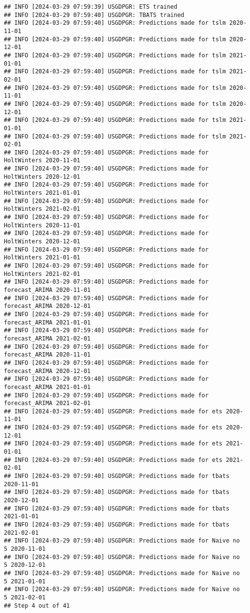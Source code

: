 \documentclass[
]{article}
\begin{document}
\begin{verbatim}
## INFO [2024-03-29 07:59:39] USGDPGR: ETS trained
## INFO [2024-03-29 07:59:40] USGDPGR: TBATS trained
## INFO [2024-03-29 07:59:40] USGDPGR: Predictions made for tslm 2020-11-01
## INFO [2024-03-29 07:59:40] USGDPGR: Predictions made for tslm 2020-12-01
## INFO [2024-03-29 07:59:40] USGDPGR: Predictions made for tslm 2021-01-01
## INFO [2024-03-29 07:59:40] USGDPGR: Predictions made for tslm 2021-02-01
## INFO [2024-03-29 07:59:40] USGDPGR: Predictions made for tslm 2020-11-01
## INFO [2024-03-29 07:59:40] USGDPGR: Predictions made for tslm 2020-12-01
## INFO [2024-03-29 07:59:40] USGDPGR: Predictions made for tslm 2021-01-01
## INFO [2024-03-29 07:59:40] USGDPGR: Predictions made for tslm 2021-02-01
## INFO [2024-03-29 07:59:40] USGDPGR: Predictions made for HoltWinters 2020-11-01
## INFO [2024-03-29 07:59:40] USGDPGR: Predictions made for HoltWinters 2020-12-01
## INFO [2024-03-29 07:59:40] USGDPGR: Predictions made for HoltWinters 2021-01-01
## INFO [2024-03-29 07:59:40] USGDPGR: Predictions made for HoltWinters 2021-02-01
## INFO [2024-03-29 07:59:40] USGDPGR: Predictions made for HoltWinters 2020-11-01
## INFO [2024-03-29 07:59:40] USGDPGR: Predictions made for HoltWinters 2020-12-01
## INFO [2024-03-29 07:59:40] USGDPGR: Predictions made for HoltWinters 2021-01-01
## INFO [2024-03-29 07:59:40] USGDPGR: Predictions made for HoltWinters 2021-02-01
## INFO [2024-03-29 07:59:40] USGDPGR: Predictions made for forecast_ARIMA 2020-11-01
## INFO [2024-03-29 07:59:40] USGDPGR: Predictions made for forecast_ARIMA 2020-12-01
## INFO [2024-03-29 07:59:40] USGDPGR: Predictions made for forecast_ARIMA 2021-01-01
## INFO [2024-03-29 07:59:40] USGDPGR: Predictions made for forecast_ARIMA 2021-02-01
## INFO [2024-03-29 07:59:40] USGDPGR: Predictions made for forecast_ARIMA 2020-11-01
## INFO [2024-03-29 07:59:40] USGDPGR: Predictions made for forecast_ARIMA 2020-12-01
## INFO [2024-03-29 07:59:40] USGDPGR: Predictions made for forecast_ARIMA 2021-01-01
## INFO [2024-03-29 07:59:40] USGDPGR: Predictions made for forecast_ARIMA 2021-02-01
## INFO [2024-03-29 07:59:40] USGDPGR: Predictions made for ets 2020-11-01
## INFO [2024-03-29 07:59:40] USGDPGR: Predictions made for ets 2020-12-01
## INFO [2024-03-29 07:59:40] USGDPGR: Predictions made for ets 2021-01-01
## INFO [2024-03-29 07:59:40] USGDPGR: Predictions made for ets 2021-02-01
## INFO [2024-03-29 07:59:40] USGDPGR: Predictions made for tbats 2020-11-01
## INFO [2024-03-29 07:59:40] USGDPGR: Predictions made for tbats 2020-12-01
## INFO [2024-03-29 07:59:40] USGDPGR: Predictions made for tbats 2021-01-01
## INFO [2024-03-29 07:59:40] USGDPGR: Predictions made for tbats 2021-02-01
## INFO [2024-03-29 07:59:40] USGDPGR: Predictions made for Naive no  5 2020-11-01
## INFO [2024-03-29 07:59:40] USGDPGR: Predictions made for Naive no  5 2020-12-01
## INFO [2024-03-29 07:59:40] USGDPGR: Predictions made for Naive no  5 2021-01-01
## INFO [2024-03-29 07:59:40] USGDPGR: Predictions made for Naive no  5 2021-02-01
## Step 4 out of 41
\end{verbatim}
\end{document}
